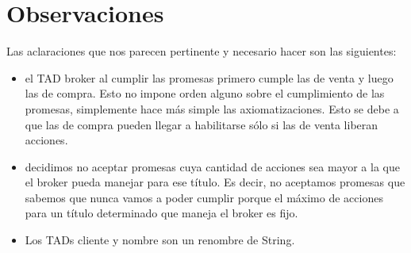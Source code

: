 \section{Observaciones}
Las aclaraciones que nos parecen pertinente y necesario hacer son las siguientes:
\begin{itemize}
 \item el TAD broker al cumplir las promesas primero cumple las de venta y luego las de compra. Esto no impone orden alguno sobre el cumplimiento de las promesas,
 simplemente hace m\'as simple las axiomatizaciones. Esto se debe a que las de compra pueden llegar a habilitarse s\'olo si las de venta liberan acciones.
 \item decidimos no aceptar promesas cuya cantidad de acciones sea mayor a la que el broker pueda manejar para ese t\'itulo. Es decir, no aceptamos promesas 
 que sabemos que nunca vamos a poder cumplir porque el m\'aximo de acciones para un t\'itulo determinado que maneja el broker es fijo.
 \item Los TADs cliente y nombre son un renombre de String.
\end{itemize}


